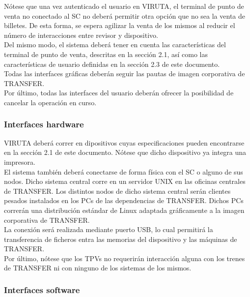 Nótese que una vez autenticado el usuario en VIRUTA, el terminal de punto de venta no conectado al SC no deberá permitir otra opción que no sea la venta de billetes. De esta forma, se espera agilizar la venta de los mismos al reducir el número de interacciones entre revisor y dispositivo.\\

Del mismo modo, el sistema deberá tener en cuenta las características del terminal de punto de venta, descritas en la sección 2.1, así como las características de usuario definidas en la sección 2.3 de este documento.\\

Todas las interfaces gráficas deberán seguir las pautas de imagen corporativa de TRANSFER.\\

Por último, todas las interfaces del usuario deberán ofrecer la posibilidad de cancelar la operación en curso.\\

\subsubsection{Interfaces hardware}

 VIRUTA deberá correr en dipositivos cuyas especificaciones  pueden encontrarse en la sección 2.1 de este documento. Nótese que dicho dispositivo ya integra una impresora.\\ 

El sistema también deberá conectarse de forma física con el SC o alguno de sus nodos. Dicho sistema central corre en un servidor UNIX en las oficinas centrales de TRANSFER. Los distintos nodos de dicho sistema central serán clientes pesados instalados en los PCs de las dependencias de TRANSFER. Dichos PCs correrán una distribución estándar de Linux adaptada gráficamente a la imagen corporativa de TRANSFER.\\

La conexión será realizada mediante puerto USB, lo cual permitirá la transferencia de ficheros entra las memorias del dispositivo y las máquinas de TRANSFER.\\

Por último, nótese que los TPVs no requerirán interacción alguna con los trenes de TRANSFER ni con ninguno de los sistemas de los mismos.

\subsubsection{Interfaces software}

